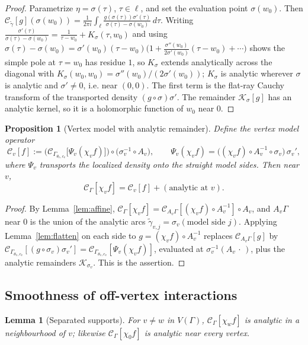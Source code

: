 \documentclass[pdflatex,sn-mathphys-num]{sn-jnl}%
\newcommand{\Cau}{\mathcal{C}}
\theoremstyle{thmstyleone}
\newtheorem{lemma}[theorem]{Lemma}
\newtheorem{proposition}[theorem]{Proposition}%
\theoremstyle{thmstyletwo}
\theoremstyle{thmstylethree}
\begin{document}
\begin{proof}
Parametrize $\eta=\sigma(\tau)$, $\tau\in\ell$, and set the evaluation point
$\sigma(w_0)$. Then
$\Cau_{\tilde\gamma}[g](\sigma(w_0))=\frac{1}{2\pi i}\int_\ell
\frac{g(\sigma(\tau))\sigma'(\tau)}{\sigma(\tau)-\sigma(w_0)}\,d\tau$. Writing
$\frac{\sigma'(\tau)}{\sigma(\tau)-\sigma(w_0)}=\frac{1}{\tau-w_0}
+K_\sigma(\tau,w_0)$ and using
$\sigma(\tau)-\sigma(w_0)=\sigma'(w_0)(\tau-w_0)\bigl(1+\tfrac{\sigma''(w_0)}
{2\sigma'(w_0)}(\tau-w_0)+\cdots\bigr)$ shows the simple pole at $\tau=w_0$ has
residue $1$, so $K_\sigma$ extends analytically across the diagonal with
$K_\sigma(w_0,w_0)=\sigma''(w_0)/(2\sigma'(w_0))$; $K_\sigma$ is analytic wherever
$\sigma$ is analytic and $\sigma'\neq0$, i.e. near $(0,0)$. The first term is the
flat-ray Cauchy transform of the transported density
$(g\circ\sigma)\sigma'$. The remainder $\mathcal K_\sigma[g]$ has an analytic
kernel, so it is a holomorphic function of $w_0$ near $0$.
\end{proof}

\begin{proposition}[Vertex model with analytic remainder]\label{prop:vertex-model}
Define the vertex model operator
\[
  \Cau_v[f]:=\bigl(\Cau_{\Gamma_{\theta_v,c_v}}\bigl[\Psi_v(\chi_v f)\bigr]\bigr)
              \circ\bigl(\sigma_v^{-1}\!\circ A_v\bigr),
  \qquad
  \Psi_v(\chi_v f)=\bigl((\chi_v f)\circ A_v^{-1}\circ\sigma_v\bigr)\,\sigma_v',
\]
where $\Psi_v$ transports the localized density onto the straight model sides.
Then near $v$,
\[
  \Cau_\Gamma[\chi_v f]=\Cau_v[f]+(\text{analytic at }v).
\]
\end{proposition}

\begin{proof}
By Lemma~\ref{lem:affine}, $\Cau_\Gamma[\chi_v f]=\Cau_{A_v\Gamma}
[(\chi_v f)\circ A_v^{-1}]\circ A_v$, and $A_v\Gamma$ near $0$ is the union of the
analytic arcs $\tilde\gamma_{v,j}=\sigma_v(\text{model side }j)$. Applying
Lemma~\ref{lem:flatten} on each side to $g=(\chi_v f)\circ A_v^{-1}$ replaces
$\Cau_{A_v\Gamma}[g]$ by $\Cau_{\Gamma_{\theta_v,c_v}}[(g\circ\sigma_v)\sigma_v']
=\Cau_{\Gamma_{\theta_v,c_v}}[\Psi_v(\chi_v f)]$, evaluated at
$\sigma_v^{-1}(A_v\,\cdot\,)$, plus the analytic remainders $\mathcal K_{\sigma_v}$.
This is the assertion.
\end{proof}

\subsection{Smoothness of off-vertex interactions}
\begin{lemma}[Separated supports]\label{lem:separated}
For $v\neq w$ in $V(\Gamma)$, $\Cau_\Gamma[\chi_w f]$ is analytic in a
neighbourhood of $v$; likewise $\Cau_\Gamma[\chi_0 f]$ is analytic near every
vertex.
\end{lemma}
\end{document}
